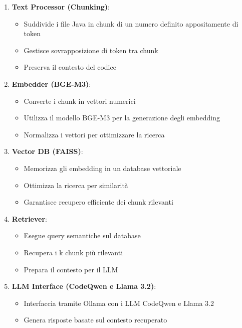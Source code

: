 \documentclass[12pt,a4paper,openright,twoside]{book}
\begin{document}
\begin{enumerate}
    \item \textbf{Text Processor (Chunking)}:
    \begin{itemize}
        \item Suddivide i file Java in chunk di un numero definito appositamente di token
        \item Gestisce sovrapposizione di token tra chunk
        \item Preserva il contesto del codice
    \end{itemize}

    \item \textbf{Embedder (BGE-M3)}:
    \begin{itemize}
        \item Converte i chunk in vettori numerici
        \item Utilizza il modello BGE-M3 per la generazione degli embedding
        \item Normalizza i vettori per ottimizzare la ricerca
    \end{itemize}

    \item \textbf{Vector DB (FAISS)}:
    \begin{itemize}
        \item Memorizza gli embedding in un database vettoriale
        \item Ottimizza la ricerca per similarità
        \item Garantisce recupero efficiente dei chunk rilevanti
    \end{itemize}

    \item \textbf{Retriever}:
    \begin{itemize}
        \item Esegue query semantiche sul database
        \item Recupera i k chunk più rilevanti
        \item Prepara il contesto per il LLM
    \end{itemize}

    \item \textbf{LLM Interface (CodeQwen e Llama 3.2)}:
    \begin{itemize}
        \item Interfaccia tramite Ollama con i LLM CodeQwen e Llama 3.2
        \item Genera risposte basate sul contesto recuperato
    \end{itemize}
\end{enumerate}
\end{document}
